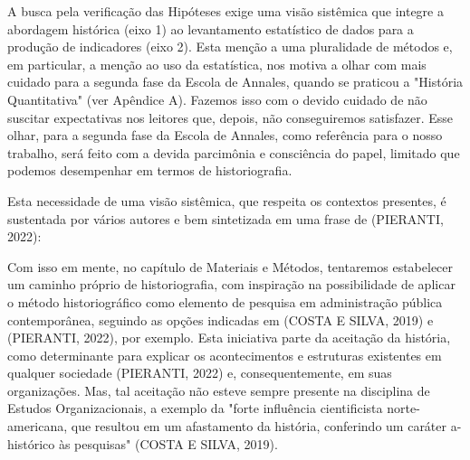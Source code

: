 \noindent\begin{center}\mbox{\centering{}}\end{center}


A busca pela verificação das Hipóteses exige uma visão sistêmica que integre a abordagem histórica (eixo 1) ao levantamento estatístico de dados para a produção de indicadores (eixo 2). Esta menção a uma pluralidade de métodos e, em particular, a menção ao uso da estatística, nos motiva a olhar com mais cuidado para a segunda fase da Escola de Annales, quando se praticou a "História Quantitativa" (ver Apêndice A). Fazemos isso com o devido cuidado de não suscitar expectativas nos leitores que, depois, não conseguiremos satisfazer. Esse olhar, para a segunda fase da Escola de Annales, como referência para o nosso trabalho, será feito com a devida parcimônia e consciência do papel, limitado que podemos desempenhar em termos de historiografia.

Esta necessidade de uma visão sistêmica, que respeita os contextos presentes, é sustentada por vários autores e bem sintetizada em uma frase de (PIERANTI, 2022):


\noindent\begin{center}\mbox{\centering{}}\end{center}


Com isso em mente, no capítulo de Materiais e Métodos, tentaremos estabelecer um caminho próprio de historiografia, com inspiração na possibilidade de aplicar o método historiográfico como elemento de pesquisa em administração pública contemporânea, seguindo as opções indicadas em  (COSTA E SILVA, 2019) e (PIERANTI, 2022), por exemplo. Esta iniciativa parte da aceitação da história, como determinante para explicar os acontecimentos e estruturas existentes em qualquer sociedade (PIERANTI, 2022) e, consequentemente, em suas organizações. Mas, tal aceitação não esteve sempre presente na disciplina de Estudos Organizacionais, a exemplo da "forte influência cientificista norte-americana, que resultou em um afastamento da história, conferindo um caráter a-histórico às pesquisas" (COSTA E SILVA, 2019).

